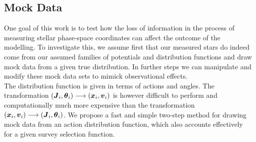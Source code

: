 

\begin{figure*}
\caption{Distribution of mock data in action space (2D iso-density contours enclosing 80\% of the stars, in the two central and the lower left panel) and configuration space (1D histograms in right panels), depending on shape and position of the survey observation volume and temperature of the stellar population. The parameters of the mock data model is given as Test \textcircled{1} in Table \ref{tbl:tests}. In the upper left panel we demonstrate the shape of the two different "wedge"-like observation volumes within which we were creating each a "hot" (red) and "cool" (blue) mock data set: a large volume centered on the Galactic plane (solid lines) and a smaller one above the plane (dashed lines).} 
\label{fig:mockdatadistr}
\end{figure*}




\subsection{Mock Data} \label{sec:mockdata}

One goal of this work is to test how the loss of information in the process of measuring stellar phase-space coordinates can affect the outcome of the modelling. To investigate this, we assume first that our measured stars do indeed come from our assumed families of potentials and distribution functions and draw mock data from a given true distribution. In further steps we can manipulate and modify these mock data sets to mimick observational effects.\\
The distribution function is given in terms of actions and angles. The transformation $(\boldsymbol{J}_i,\boldsymbol{\theta}_i) \longrightarrow (\boldsymbol{x}_i,\boldsymbol{v}_i)$ is however difficult to perform and computationally much more expensive than the transformation $(\boldsymbol{x}_i,\boldsymbol{v}_i) \longrightarrow (\boldsymbol{J}_i,\boldsymbol{\theta}_i)$. We propose a fast and simple two-step method for drawing mock data from an action distribution function, which also accounts effectively for a given survey selection function.


